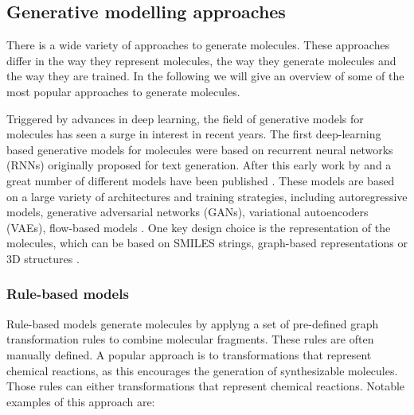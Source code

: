 \subsection{Generative modelling approaches}
There is a wide variety of approaches to generate molecules. These approaches
differ in the way they represent molecules, the way they generate molecules
and the way they are trained. In the following we will give an overview of
some of the most popular approaches to generate molecules. 

Triggered by advances in deep learning, the field of generative models for
molecules has seen a surge in interest in recent years. The first deep-learning
based generative models for molecules were based on recurrent neural networks
(RNNs) originally proposed for text generation. After this early work by
\citep{seglerGeneratingFocusedMolecule2018} and
\citep{gomez-bombarelliAutomaticChemicalDesign2018} a great number of different
models have been published
\citep{eltonDeepLearningMolecular2019,sanchez-lengelingInverseMolecularDesign2018}.
These models are based on a large variety of architectures and training
strategies, including autoregressive models, generative adversarial networks
(GANs), variational autoencoders (VAEs), flow-based models
\citep{madhawaGraphNVPInvertibleFlow2019}. One key design choice is the
representation of the molecules, which can be based on SMILES strings,
graph-based representations or 3D structures
\citep{eltonDeepLearningMolecular2019,sanchez-lengelingInverseMolecularDesign2018,pangDeepGenerativeModels2024}.

\subsubsection{Rule-based models}
Rule-based models generate molecules by applyng a set of pre-defined
graph transformation rules to combine molecular fragments.
These rules are often manually defined. A popular approach is to 
transformations that represent chemical reactions, as this encourages 
the generation of synthesizable molecules.
Those rules can either 
transformations that represent chemical reactions. 
Notable examples of this approach are: 

